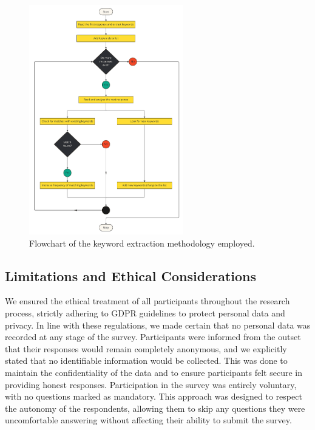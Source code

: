 \begin{figure}[ht]
  \centering
  \includegraphics[width=0.6\textwidth]{figure/keyword_extraction_flowchart.pdf}
  \caption{Flowchart of the keyword extraction methodology employed.}
  \label{fig:kye_extraction}
\end{figure}


\subsection{Limitations and Ethical Considerations}

We ensured the ethical treatment of all participants throughout the research process, strictly adhering to GDPR guidelines to protect personal data and privacy. In line with these regulations, we made certain that no personal data was recorded at any stage of the survey. Participants were informed from the outset that their responses would remain completely anonymous, and we explicitly stated that no identifiable information would be collected. This was done to maintain the confidentiality of the data and to ensure participants felt secure in providing honest responses. Participation in the survey was entirely voluntary, with no questions marked as mandatory. This approach was designed to respect the autonomy of the respondents, allowing them to skip any questions they were uncomfortable answering without affecting their ability to submit the survey. 

